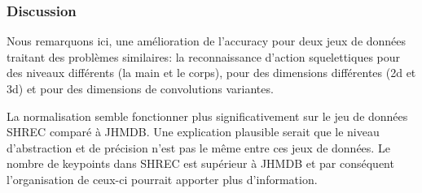 \begin{itemize}
\begin{table}[H]
\centering
{}
\caption{Résulats obtenus grâce à la normalisation DFS sur JHMDB \cite{jhuang2013towards} (Squelettes corps humain 2D) pour un réseau convolutif 2D: Lenet.}
\end{table}
\end{itemize}

\subsubsection{Discussion}

Nous remarquons ici, une amélioration de l'accuracy pour deux jeux de données traitant des problèmes similaires: la reconnaissance d'action squelettiques pour des niveaux différents (la main et le corps), pour des dimensions différentes (2d et 3d) et pour des dimensions de convolutions variantes.

La normalisation semble fonctionner plus significativement sur le jeu de données SHREC comparé à JHMDB. Une explication plausible serait que le niveau d'abstraction et de précision n'est pas le même entre ces jeux de données. Le nombre de keypoints dans SHREC est supérieur à JHMDB et par conséquent l'organisation de ceux-ci pourrait apporter plus d'information. 


